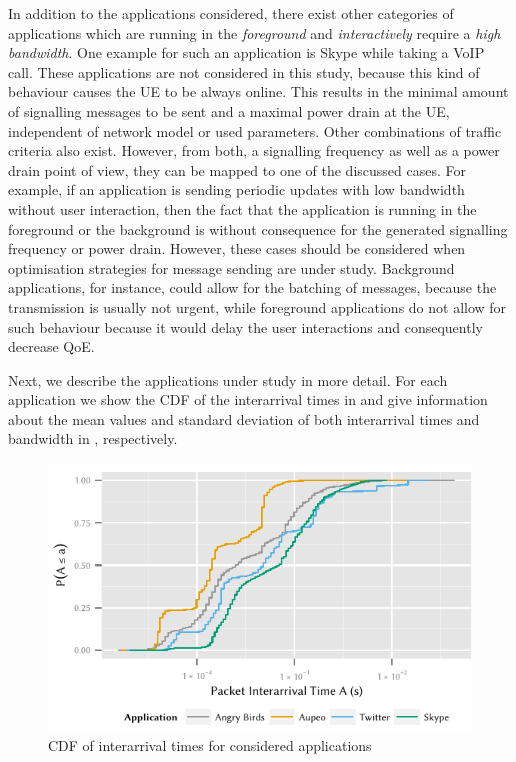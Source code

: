 In addition to the applications considered, there exist other categories of applications which are running in the \emph{foreground} and \emph{interactively} require a \emph{high bandwidth}.
One example for such an application is Skype while taking a \gls{VoIP} call.
These applications are not considered in this study, because this kind of behaviour causes the \gls{UE} to be always online.
This results in the minimal amount of signalling messages to be sent and a maximal power drain at the \gls{UE}, independent of network model or used parameters.
Other combinations of traffic criteria also exist.
However, from both, a signalling frequency as well as a power drain point of view, they can be mapped to one of the discussed cases.
For example, if an application is sending periodic updates with low bandwidth without user interaction, then the fact that the application is running in the foreground or the background is without consequence for the generated signalling frequency or power drain.
However, these cases should be considered when optimisation strategies for message sending are under study.
Background applications, for instance, could allow for the batching of messages, because the transmission is usually not urgent, while foreground applications do not allow for such behaviour because it would delay the user interactions and consequently decrease \gls{QoE}.

Next, we describe the applications under study in more detail.
For each application we show the \gls{CDF} of the interarrival times in  and give information about the mean values and standard deviation of both interarrival times and bandwidth in , respectively.

\begin{figure}
\centering
\includegraphics{network/network_traces/numerical_results/figures/interarrival_times}
\caption{CDF of interarrival times for considered applications}\label{fig:network:network_traces:numerical_results:traffic:interarrival_times}
\end{figure}

